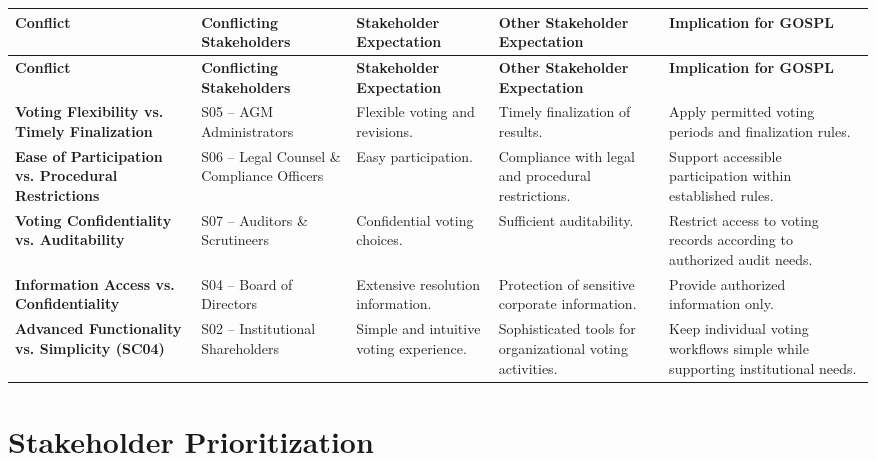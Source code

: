 \documentclass[11pt,a4paper]{article}
\begin{document}
\begingroup\small
\begin{longtable}{@{}>{\raggedright\arraybackslash}p{}>{\raggedright\arraybackslash}p{}>{\raggedright\arraybackslash}p{}>{\raggedright\arraybackslash}p{}>{\raggedright\arraybackslash}p{}@{}}
\toprule
\textbf{Conflict} & \textbf{Conflicting Stakeholders} & \textbf{Stakeholder Expectation} & \textbf{Other Stakeholder Expectation} & \textbf{Implication for GOSPL} \\
\midrule
\endfirsthead
\toprule
\textbf{Conflict} & \textbf{Conflicting Stakeholders} & \textbf{Stakeholder Expectation} & \textbf{Other Stakeholder Expectation} & \textbf{Implication for GOSPL} \\
\midrule
\endhead
\bottomrule
\endfoot
\textbf{Voting Flexibility vs. Timely Finalization} & S05 -- AGM Administrators & Flexible voting and revisions. & Timely finalization of results. & Apply permitted voting periods and finalization rules. \\
\addlinespace
\textbf{Ease of Participation vs. Procedural Restrictions} & S06 -- Legal Counsel \& Compliance Officers & Easy participation. & Compliance with legal and procedural restrictions. & Support accessible participation within established rules. \\
\addlinespace
\textbf{Voting Confidentiality vs. Auditability} & S07 -- Auditors \& Scrutineers & Confidential voting choices. & Sufficient auditability. & Restrict access to voting records according to authorized audit needs. \\
\addlinespace
\textbf{Information Access vs. Confidentiality} & S04 -- Board of Directors & Extensive resolution information. & Protection of sensitive corporate information. & Provide authorized information only. \\
\addlinespace
\textbf{Advanced Functionality vs. Simplicity (SC04)} & S02 -- Institutional Shareholders & Simple and intuitive voting experience. & Sophisticated tools for organizational voting activities. & Keep individual voting workflows simple while supporting institutional needs. \\
\end{longtable}
\endgroup


\section*{Stakeholder Prioritization}
\end{document}
